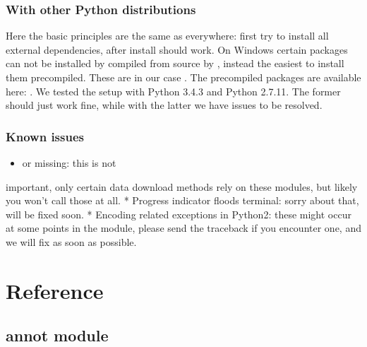 \documentclass[letterpaper,10pt,english]{sphinxmanual}
\begin{document}
\subsection{With other Python distributions}
\label{\detokenize{installation:with-other-python-distributions}}
Here the basic principles are the same as everywhere: first try to install all
external dependencies, after  install should work. On Windows certain
packages can not be installed by compiled from source by , instead the
easiest to install them precompiled. These are in our case . The
precompiled packages are available here:
. We tested the setup with Python
3.4.3 and Python 2.7.11. The former should just work fine, while with the
latter we have issues to be resolved.


\subsection{Known issues}
\label{\detokenize{installation:known-issues}}\begin{itemize}
\item {} 
 \textendash{} or  missing: this is not

\end{itemize}

important, only certain data download methods rely on these modules, but
likely you won’t call those at all.
* Progress indicator floods terminal: sorry about that, will be fixed soon.
* Encoding related exceptions in Python2: these might occur at some points in
the module, please send the traceback if you encounter one, and we will fix
as soon as possible.



\chapter{Reference}
\label{\detokenize{reference:reference}}\label{\detokenize{reference::doc}}

\section{annot module}
\label{\detokenize{reference:module-pypath.annot}}\label{\detokenize{reference:annot-module}}
\end{document}
